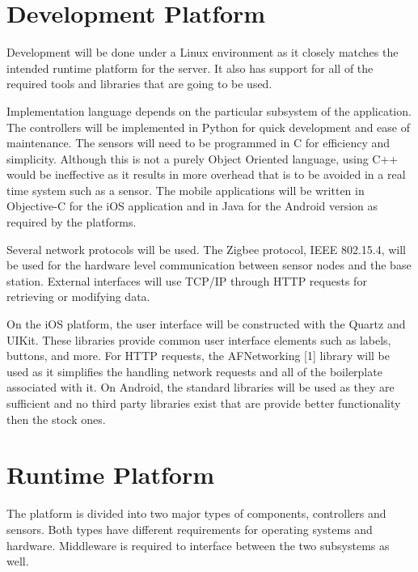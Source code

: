 \documentclass{report}
\begin{document}
\section{Development Platform}


Development will be done under a Linux environment as it closely matches the
intended runtime platform for the server. It also has support for all of the
required tools and libraries that are going to be used. 

Implementation language depends on the particular subsystem of the application.
The controllers will be implemented in Python for quick development and ease of 
maintenance. The sensors will need to be programmed in C for efficiency and
simplicity. Although this is not a purely Object Oriented language, using C++
would be ineffective as it results in more overhead that is to be avoided in a
real time system such as a sensor. The mobile applications will be written in
Objective-C for the iOS application and in Java for the Android version as
required by the platforms.

Several network protocols will be used. The Zigbee protocol, IEEE
802.15.4, will be used for the hardware level communication between
sensor nodes and the base station. External interfaces will use TCP/IP
through HTTP requests for retrieving or modifying data.

On the iOS platform, the user interface will be constructed with the Quartz and
UIKit. These libraries provide common user interface elements such as labels,
buttons, and more. For HTTP requests, the AFNetworking [1]
library will be used as it simplifies the handling network requests and all of
the boilerplate associated with it. On Android, the standard libraries will be
used as they are sufficient and no third party libraries exist that are provide
better functionality then the stock ones.

\section{Runtime Platform}
The platform is divided into two major types of components, controllers and
sensors. Both types have different requirements for operating systems and
hardware. Middleware is required to interface between the two subsystems as
well. 
\end{document}
